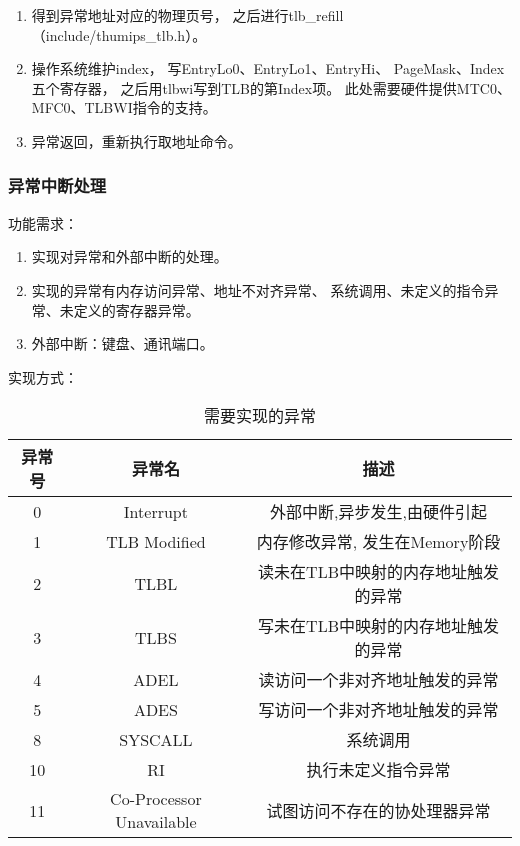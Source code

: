 \begin{enumerate}
\begin{enumerate}
                \item
                    得到异常地址对应的物理页号，%
                    之后进行tlb\_refill（include/thumips\_tlb.h）。
                \item
                    操作系统维护index，%
                    写EntryLo0、EntryLo1、EntryHi、 PageMask、Index五个寄存器，%
                    之后用tlbwi写到TLB的第Index项。%
                    此处需要硬件提供MTC0、MFC0、TLBWI指令的支持。
                \item
                    异常返回，重新执行取地址命令。%
                \end{enumerate}
            \end{enumerate}

        \subsubsection{异常中断处理}
            功能需求：
            \begin{enumerate}
            \item
            实现对异常和外部中断的处理。
            \item
            实现的异常有内存访问异常、地址不对齐异常、%
            系统调用、未定义的指令异常、未定义的寄存器异常。
            \item
            外部中断：键盘、通讯端口。
            \end{enumerate}

            实现方式：
            \begin{table}
            \centering
            \caption{需要实现的异常}
            \begin{tabular}{|c|c|c|}
            \hline
            异常号 & 异常名 & 描述 \\
            \hline
            0 & Interrupt & 外部中断,异步发生,由硬件引起 \\
            \hline
            1 & TLB Modified & 内存修改异常, 发生在Memory阶段 \\
            \hline
            2 & TLBL & 读未在TLB中映射的内存地址触发的异常 \\
            \hline
            3 & TLBS & 写未在TLB中映射的内存地址触发的异常 \\
            \hline
            4 & ADEL　& 读访问一个非对齐地址触发的异常 \\
            \hline
            5 & ADES & 写访问一个非对齐地址触发的异常 \\
            \hline
            8 & SYSCALL & 系统调用 \\
            \hline
            10 & RI & 执行未定义指令异常 \\
            \hline
            11 & Co-Processor Unavailable & 试图访问不存在的协处理器异常 \\
            \hline
            \end{tabular}
            \end{table}


